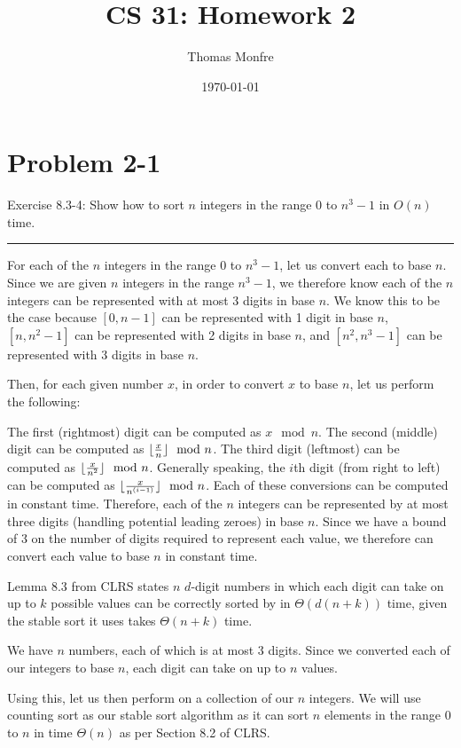 \documentclass[11pt]{article}
\title{CS 31: Homework 2}
\author{Thomas Monfre}
\date{\today}
\def\separateline{\medskip\hrule\medskip}
\DeclarePairedDelimiter\floor{\lfloor}{\rfloor}
\begin{document}
\maketitle

\section{Problem 2-1}
Exercise 8.3-4: Show how to sort $n$ integers in the range 0 to $n^3 - 1$ in $O(n)$ time.
\separateline

For each of the $n$ integers in the range 0 to $n^3 - 1$, let us convert each to base $n$. Since we are given $n$ integers in the range $n^3 - 1$, we therefore know each of the $n$ integers can be represented with at most 3 digits in base $n$. We know this to be the case because $[0, n-1]$ can be represented with 1 digit in base $n$, $[n, n^2 - 1]$ can be represented with 2 digits in base $n$, and $[n^2, n^3 - 1]$ can be represented with 3 digits in base $n$.

Then, for each given number $x$, in order to convert $x$ to base $n$, let us perform the following:

The first (rightmost) digit can be computed as $x \mod n$. The second (middle) digit can be computed as $\floor{\frac{x}{n}} \mod n$. The third digit (leftmost) can be computed as $\floor{\frac{x}{n^2}} \mod n$. Generally speaking, the $i$th digit (from right to left) can be computed as $\floor{\frac{x}{n^{(i - 1)}}} \mod n$. Each of these conversions can be computed in constant time. Therefore, each of the $n$ integers can be represented by at most three digits (handling potential leading zeroes) in base $n$. Since we have a bound of 3 on the number of digits required to represent each value, we therefore can convert each value to base $n$ in constant time.

Lemma 8.3 from CLRS states $n$ $d$-digit numbers in which each digit can take on up to $k$ possible values can be correctly sorted by  in $\Theta(d(n + k))$ time, given the stable sort it uses takes $\Theta(n + k)$ time.

We have $n$ numbers, each of which is at most 3 digits. Since we converted each of our integers to base $n$, each digit can take on up to $n$ values.

Using this, let us then perform  on a collection of our $n$ integers. We will use counting sort as our stable sort algorithm as it can sort $n$ elements in the range 0 to $n$ in time $\Theta(n)$ as per Section 8.2 of CLRS.
\end{document}
